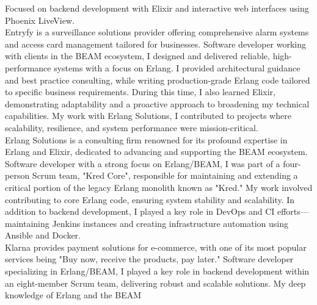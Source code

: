 \documentclass[purpleprocv]{procv}
\begin{document}
\begin{procv-twocolumns}
{          
          {Focused on backend development with Elixir and interactive web interfaces using Phoenix LiveView.
          \\[3pt]
          Entryfy is a surveillance solutions provider offering comprehensive alarm systems and access card management tailored for businesses.}
          {Software developer working with clients in the BEAM ecosystem, I designed and delivered reliable, 
          high-performance systems with a focus on Erlang. I provided architectural guidance and best practice 
          consulting, while writing production-grade Erlang code tailored to specific business requirements. During this time, 
          I also learned Elixir, demonstrating adaptability and a proactive approach to broadening my technical capabilities. 
          My work with Erlang Solutions, I contributed to projects where scalability, resilience, and system performance were mission-critical.
          \\[3pt]
          Erlang Solutions is a consulting firm renowned for its profound expertise in Erlang and Elixir, 
          dedicated to advancing and supporting the BEAM ecosystem.}
          {Software developer with a strong focus on Erlang/BEAM, I was part of a four-person Scrum team, "Kred Core",
          responsible for maintaining and extending a critical portion of the legacy Erlang monolith known as "Kred." My 
          work involved contributing to core Erlang code, ensuring system stability and scalability. In addition to 
          backend development, I played a key role in DevOps and CI efforts—maintaining Jenkins instances and creating 
          infrastructure automation using Ansible and Docker.
          \\[3pt]
          Klarna provides payment solutions for e-commerce, with one of its most popular services being 
          "Buy now, receive the products, pay later."}
          {Software developer specializing in Erlang/BEAM, I played a key role in backend development within an 
          eight-member Scrum team, delivering robust and scalable solutions. My deep knowledge of Erlang and the BEAM 
}}
\end{procv-twocolumns}
\end{document}
